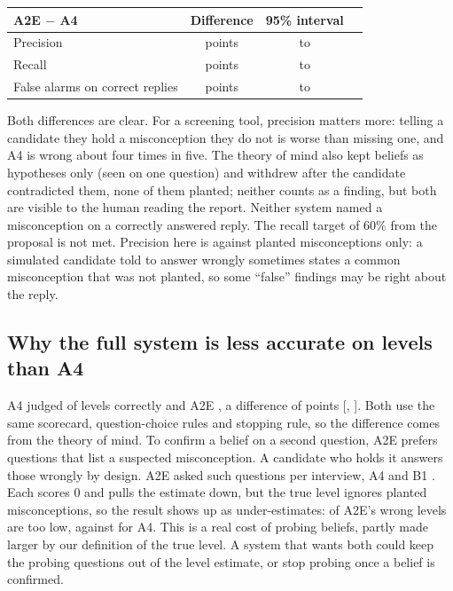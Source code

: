 \documentclass[10pt,a4paper]{article}
\newcommand{\ci}[2]{{\small[#1, #2]}}
\begin{document}
\begin{center}\small
\begin{tabular}{@{}lccc@{}}
\toprule
A2E $-$ A4 & Difference & 95\% interval \\
\midrule
Precision & \fFullVsAfourPrecisionDiff{} points & \fFullVsAfourPrecisionLow{} to \fFullVsAfourPrecisionHigh{} \\
Recall & \fFullVsAfourRecallDiff{} points & \fFullVsAfourRecallLow{} to \fFullVsAfourRecallHigh{} \\
False alarms on correct replies & \fFullVsAfourFalseAlarmRateDiff{} points & \fFullVsAfourFalseAlarmRateLow{} to \fFullVsAfourFalseAlarmRateHigh{} \\
\bottomrule
\end{tabular}
\end{center}

\noindent Both differences are clear. For a screening tool, precision matters more: telling a
candidate they hold a misconception they do not is worse than missing one, and A4 is wrong about four
times in five. The theory of mind also kept \fSuspectedFull{} beliefs as hypotheses only (seen on one
question) and withdrew \fDisputedFull{} after the candidate contradicted them, none of them planted;
neither counts as a finding, but both are visible to the human reading the report. Neither system named a misconception on a correctly answered reply. The recall target of
60\% from the proposal is not met. Precision here is against planted misconceptions only: a
simulated candidate told to answer wrongly sometimes states a common misconception that was not
planted, so some ``false'' findings may be right about the reply.

\subsection{Why the full system is less accurate on levels than A4}
\label{sec:levels-why}

A4 judged \fAccAfour{} of levels correctly and A2E \fAccFull{}, a difference of
\fFullVsAfourSkillAccuracyDiff{} points \ci{\fFullVsAfourSkillAccuracyLow}{\fFullVsAfourSkillAccuracyHigh}.
Both use the same scorecard, question-choice rules and stopping rule, so the difference comes
from the theory of mind. To confirm a belief on a second question, A2E prefers questions that list a suspected
misconception. A candidate who holds it answers those wrongly by design. A2E asked \fHeldBeliefFull{}
such questions per interview, A4 \fHeldBeliefAfour{} and B1 \fHeldBeliefBOne{}. Each scores 0 and
pulls the estimate down, but the true level ignores planted misconceptions, so the result shows up
as under-estimates: \fUnderFull{} of A2E's wrong levels are too low, against \fUnderAfour{} for A4.
This is a real cost of probing beliefs, partly made larger by our definition of the true level. A
system that wants both could keep the probing questions out of the level estimate, or stop probing
once a belief is confirmed.
\end{document}
